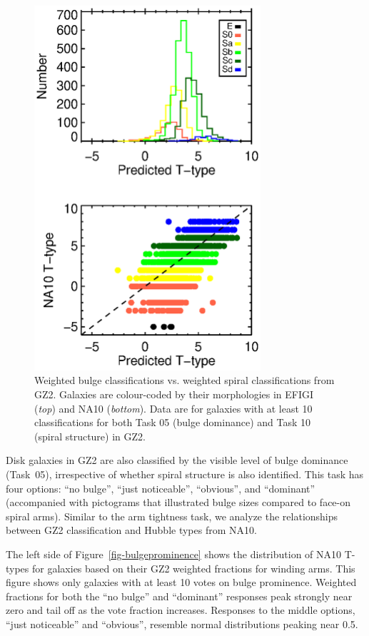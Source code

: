 \documentclass[useAMS,usenatbib]{mn2e}
\begin{document}
\begin{figure}
\includegraphics[angle=0,width=3.3in]{figures/eureqa.eps}
\caption{Weighted bulge classifications vs. weighted spiral classifications from GZ2. Galaxies are colour-coded by their morphologies in EFIGI ({\it top}) and NA10 ({\it bottom}). Data are for galaxies with at least 10 classifications for both Task 05 (bulge dominance) and Task 10 (spiral structure) in GZ2. 
\label{fig-eureqa}}
\end{figure}

Disk galaxies in GZ2 are also classified by the visible level of bulge dominance (Task~05), irrespective of whether spiral structure is also identified. This task has four options: ``no bulge'', ``just noticeable'', ``obvious'', and ``dominant'' (accompanied with pictograms that illustrated bulge sizes compared to face-on spiral arms). Similar to the arm tightness task, we analyze the relationships between GZ2 classification and Hubble types from NA10. 

The left side of Figure~\ref{fig-bulgeprominence} shows the distribution of NA10 T-types for galaxies based on their GZ2 weighted fractions for winding arms. This figure shows only galaxies with at least 10 votes on bulge prominence. Weighted fractions for both the ``no bulge'' and ``dominant'' responses peak strongly near zero and tail off as the vote fraction increases. Responses to the middle options, ``just noticeable'' and ``obvious'', resemble normal distributions peaking near 0.5. 
\end{document}
